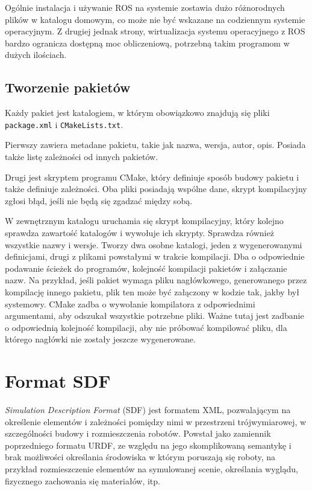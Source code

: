 	Ogólnie instalacja i używanie ROS na systemie zostawia dużo różnorodnych plików w katalogu domowym, co może nie być wskazane na codziennym systemie operacyjnym.
	Z drugiej jednak strony, wirtualizacja systemu operacyjnego z ROS bardzo ogranicza dostępną moc obliczeniową, potrzebną takim programom w dużych ilościach.
	
	\subsection{Tworzenie pakietów}
		Każdy pakiet jest katalogiem, w którym obowiązkowo znajdują się pliki \texttt{package.xml} i \texttt{CMakeLists.txt}.
		
		Pierwszy zawiera metadane pakietu, takie jak nazwa, wersja, autor, opis.
		Posiada także listę zależności od innych pakietów.
		
		Drugi jest skryptem programu CMake, który definiuje sposób budowy pakietu i także definiuje zależności.
		Oba pliki posiadają wspólne dane, skrypt kompilacyjny zgłosi błąd, jeśli nie będą się zgadzać między sobą.
		
		W zewnętrznym katalogu uruchamia się skrypt kompilacyjny, który kolejno sprawdza zawartość katalogów i wywołuje ich skrypty.
		Sprawdza również wszystkie nazwy i wersje. Tworzy dwa osobne katalogi, jeden z wygenerowanymi definicjami, drugi z plikami powstałymi w trakcie kompilacji.
		Dba o odpowiednie podawanie ścieżek do programów, kolejność kompilacji pakietów i załączanie nazw.
		Na przykład, jeśli pakiet wymaga pliku nagłówkowego, generowanego przez kompilację innego pakietu, plik ten może być załączony w kodzie tak, jakby był systemowy.
		CMake zadba o wywołanie kompilatora z odpowiednimi argumentami, aby odszukał wszystkie potrzebne pliki.
		Ważne tutaj jest zadbanie o odpowiednią kolejność kompilacji, aby nie próbować kompilować pliku, dla którego nagłówki nie zostały jeszcze wygenerowane.

\section{Format SDF}
	\label{sec:sdf}
	\emph{Simulation Description Format} (SDF) \cite{sdf_website} jest formatem XML, pozwalającym na określenie elementów i zależności pomiędzy nimi w przestrzeni trójwymiarowej, 
	w szczególności budowy i rozmieszczenia robotów.
	Powstał jako zamiennik poprzedniego formatu URDF, ze względu na jego skomplikowaną semantykę i brak możliwości określania środowiska w którym poruszają się roboty,
	na przykład rozmieszczenie elementów na symulowanej scenie, określania wyglądu, fizycznego zachowania się materiałów, itp.


